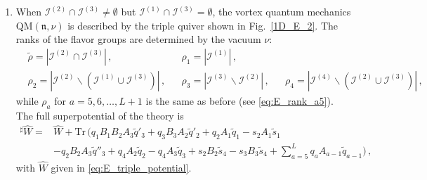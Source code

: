 \documentclass[12pt,a4paper]{article}
\newcommand{\nn}{\mathfrak{n}}
\renewcommand{\(}{\left(}
\renewcommand{\)}{\right)}
\renewcommand{\(}{\left(}
\renewcommand{\)}{\right)}
\begin{document}
\begin{enumerate}
\item When $\mathcal{I}^{(2)}\cap\mathcal{I}^{(3)} \neq\emptyset$ but $\mathcal{I}^{(1)}\cap\mathcal{I}^{(3)} =\emptyset$, the vortex quantum mechanics $\textrm{QM}(\nn,\nu)$ is described by the triple quiver shown in Fig.~\ref{1D_E_2}. 
The ranks of the flavor groups are determined by the vacuum $\nu$:
\begin{equation}
\begin{aligned}
&\tilde{\rho}=|\mathcal{I}^{(2)}\cap\mathcal{I}^{(3)}|\,,
&&\rho_1=|\mathcal{I}^{(1)}|\,,\\
&\rho_2=|\mathcal{I}^{(2)}\backslash (\mathcal{I}^{(1)}\cup\mathcal{I}^{(3)})|\,,
&&\rho_3=|\mathcal{I}^{(3)}\backslash\mathcal{I}^{(2)}|\,,
&& \rho_4=|\mathcal{I}^{(4)}\backslash(\mathcal{I}^{(2)}\cup\mathcal{I}^{(3)})|\,,
\end{aligned}
\end{equation}
while $\rho_a$ for $a=5,6,\dots,L+1$ is the same as before (see \eqref{eq:E_rank_a5}). 
The full superpotential of the theory is
\begin{equation}
\begin{aligned}
{}^\sharp \widehat{W}=&\widehat{W}+\mathrm{Tr}\,(q_1B_1B_2A_3\tilde{q}'_3+q_3B_3A_2\tilde{q}'_2+q_2A_1\tilde{q}_1-s_2A_1\tilde{s}_1\\
&-q_2B_2A_3\tilde{q}''_3+q_4A_2\tilde{q}_2-q_4A_3\tilde{q}_3+s_2B_2\tilde{s}_4-s_3B_3\tilde{s}_4+\sum_{a=5}^{L}q_aA_{a-1}\tilde{q}_{a-1})\,,
\end{aligned}
\end{equation}
with $\widehat{W}$ given in \eqref{eq:E_triple_potential}.





\end{enumerate}
\end{document}
